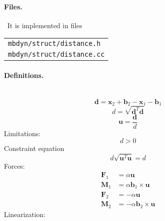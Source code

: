 \documentclass[10pt,dvips,fleqn,subeqn]{report}
\newcommand{\T}[1]{\bm{#1}}
\begin{document}
\paragraph{Files.} \
It is implemented in files

\begin{tabular}{l}
\texttt{mbdyn/struct/distance.h} \\
\texttt{mbdyn/struct/distance.cc}
\end{tabular}

\paragraph{Definitions.} \
\begin{equation}
	\T{d} = \T{x}_2 + \T{b}_2 - \T{x}_1 - \T{b}_1
\end{equation}
\begin{equation}
	d = \sqrt{\T{d}^T \T{d}}
\end{equation}
\begin{equation}
	\T{u} = \frac{\T{d}}{d}
\end{equation}
Limitations:
\begin{equation}
	d > 0
\end{equation}
Constraint equation 
\begin{equation}
	d \sqrt{\T{u}^T \T{u}} = d
\end{equation}
Forces:
\begin{subequations}
\begin{align}
	\T{F}_1 &= \alpha \T{u} \\
	\T{M}_1 &= \alpha \T{b}_1 \times \T{u} \\
	\T{F}_2 &= -\alpha \T{u} \\
	\T{M}_2 &= -\alpha \T{b}_2 \times \T{u}
\end{align}
\end{subequations}
Linearization:
\end{document}
